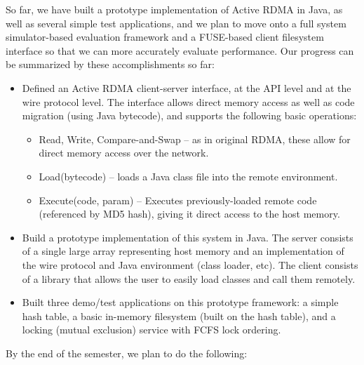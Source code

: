\documentclass[10pt]{article}
\begin{document}
So far, we have built a prototype implementation of Active RDMA in
Java, as well as several simple test applications, and we plan to move
onto a full system simulator-based evaluation framework and a
FUSE-based client filesystem interface so that we can more accurately
evaluate performance. Our progress can be summarized by these
accomplishments so far:

\begin{itemize}
\item Defined an Active RDMA client-server interface, at the API level
  and at the wire protocol level. The interface allows direct memory
  access as well as code migration (using Java bytecode), and supports the following basic operations:
  \begin{itemize}
  \item Read, Write, Compare-and-Swap -- as in original RDMA, these
    allow for direct memory access over the network.
  \item Load(bytecode) -- loads a Java class file into the remote
    environment.
  \item Execute(code, param) -- Executes previously-loaded remote code
    (referenced by MD5 hash), giving it direct access to the host
    memory.
  \end{itemize}
\item Build a prototype implementation of this system in Java. The
  server consists of a single large array representing host memory and
  an implementation of the wire protocol and Java environment (class
  loader, etc). The client consists of a library that allows the user
  to easily load classes and call them remotely.
\item Built three demo/test applications on this prototype framework:
  a simple hash table, a basic in-memory filesystem (built on the hash
  table), and a locking (mutual exclusion) service with FCFS lock
  ordering.
\end{itemize}

By the end of the semester, we plan to do the following:
\end{document}
